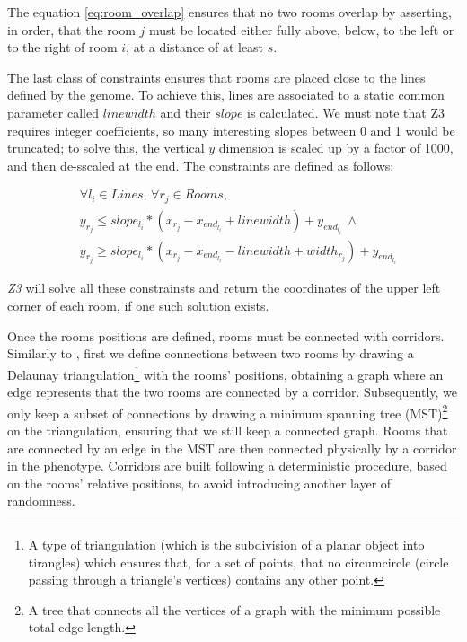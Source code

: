 \documentclass{Configuration_Files/PoliMi3i_thesis}
\begin{document}
The equation \ref{eq:room_overlap} ensures that no two rooms overlap by asserting, in order, that the room $j$ must be located either fully above, below, to the left or to the right of room $i$, at a distance of at least $s$.

The last class of constraints ensures that rooms are placed close to the lines defined by the genome. To achieve this, lines are associated to a static common parameter called $linewidth$ and their $slope$ is calculated. We must note that Z3 requires integer coefficients, so many interesting slopes between 0 and 1 would be truncated; to solve this, the vertical $y$ dimension is scaled up by a factor of 1000, and then de-sscaled at the end. The constraints are defined as follows:

\begin{equation}
\label{eq:room_line}
    \begin{split}
        &\forall l_i \in Lines,\, \forall r_j \in Rooms, \\
        &y_{r_j} \leq slope_{l_i} * (x_{r_j} - x_{end_{l_i}} + linewidth) + y_{end_{l_i}} \:\land \\
        &y_{r_j} \geq slope_{l_i} * (x_{r_j} - x_{end_{l_i}} - linewidth + width_{r_j}) + y_{end_{l_i}}
    \end{split}
\end{equation}

\textit{Z3} will solve all these constrainsts and return the coordinates of the upper left corner of each room, if one such solution exists.

Once the rooms positions are defined, rooms must be connected with corridors. Similarly to \citeauthor{whitehead_spatial_2020}, first we define connections between two rooms by drawing a Delaunay triangulation\footnote{A type of triangulation (which is the subdivision of a planar object into tirangles) which ensures that, for a set of points, that no circumcircle (circle passing through a triangle's vertices) contains any other point.} with the rooms' positions, obtaining a graph where an edge represents that the two rooms are connected by a corridor. Subsequently, we only keep a subset of connections by drawing a minimum spanning tree (MST)\footnote{A tree that connects all the vertices of a graph with the minimum possible total edge length.} on the triangulation, ensuring that we still keep a connected graph. Rooms that are connected by an edge in the MST are then connected physically by a corridor in the phenotype. Corridors are built following a deterministic procedure, based on the rooms' relative positions, to avoid introducing another layer of randomness. 
\end{document}
